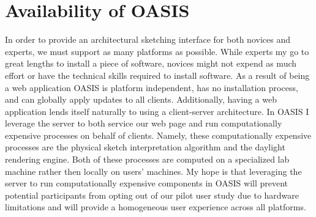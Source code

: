 \section{Availability of OASIS}
In order to provide an architectural sketching interface for both novices and experts,  we must support as many platforms as possible. While experts my go to great lengths to install a piece of software, novices might not expend as much effort or have the technical skills required to install software.
As a result of being a web application OASIS is platform independent, has no installation process, and can globally apply updates to all clients.
Additionally, having a web application lends itself naturally to using a client-server architecture.
In OASIS I leverage the server to both service our web page and run computationally expensive processes on behalf of clients.
Namely, these computationally expensive processes are the physical sketch interpretation algorithm and the daylight rendering engine.
Both of these processes are computed on a specialized lab machine rather then locally on users' machines.
My hope is that leveraging the server to run computationally expensive components in OASIS will prevent potential participants from opting out of our pilot user study due to hardware limitations and will provide a homogeneous user experience across all platforms.


